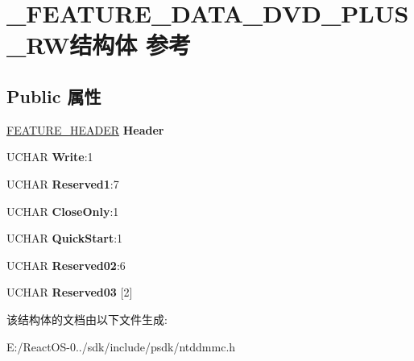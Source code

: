 \hypertarget{struct___f_e_a_t_u_r_e___d_a_t_a___d_v_d___p_l_u_s___r_w}{}\section{\+\_\+\+F\+E\+A\+T\+U\+R\+E\+\_\+\+D\+A\+T\+A\+\_\+\+D\+V\+D\+\_\+\+P\+L\+U\+S\+\_\+\+R\+W结构体 参考}
\label{struct___f_e_a_t_u_r_e___d_a_t_a___d_v_d___p_l_u_s___r_w}
\subsection*{Public 属性}
\begin{DoxyCompactItemize}
\item 
\mbox{\label{struct___f_e_a_t_u_r_e___d_a_t_a___d_v_d___p_l_u_s___r_w_a944512c90ff3f1a142c5101f2aa517cd}} 
\hyperlink{struct___f_e_a_t_u_r_e___h_e_a_d_e_r}{F\+E\+A\+T\+U\+R\+E\+\_\+\+H\+E\+A\+D\+ER} {\bfseries Header}
\item 
\mbox{\label{struct___f_e_a_t_u_r_e___d_a_t_a___d_v_d___p_l_u_s___r_w_af1ec73ba1ae8e2dea42b6c14406ebd39}} 
U\+C\+H\+AR {\bfseries Write}\+:1
\item 
\mbox{\label{struct___f_e_a_t_u_r_e___d_a_t_a___d_v_d___p_l_u_s___r_w_a64d31074e83bba764a63e01ef7a4dbdb}} 
U\+C\+H\+AR {\bfseries Reserved1}\+:7
\item 
\mbox{\label{struct___f_e_a_t_u_r_e___d_a_t_a___d_v_d___p_l_u_s___r_w_a3b51c914a2f6e95666771594d3a47b4f}} 
U\+C\+H\+AR {\bfseries Close\+Only}\+:1
\item 
\mbox{\label{struct___f_e_a_t_u_r_e___d_a_t_a___d_v_d___p_l_u_s___r_w_afe11e9e4b0b352d7f8e8daa59c823f3b}} 
U\+C\+H\+AR {\bfseries Quick\+Start}\+:1
\item 
\mbox{\label{struct___f_e_a_t_u_r_e___d_a_t_a___d_v_d___p_l_u_s___r_w_aa86b5f712507c2e2d5f40c64733ea7ab}} 
U\+C\+H\+AR {\bfseries Reserved02}\+:6
\item 
\mbox{\label{struct___f_e_a_t_u_r_e___d_a_t_a___d_v_d___p_l_u_s___r_w_a044f4ef73be9b859f8e41e86847c0014}} 
U\+C\+H\+AR {\bfseries Reserved03} \mbox{[}2\mbox{]}
\end{DoxyCompactItemize}


该结构体的文档由以下文件生成\+:\begin{DoxyCompactItemize}
\item 
E\+:/\+React\+O\+S-\/0../sdk/include/psdk/ntddmmc.\+h\end{DoxyCompactItemize}
